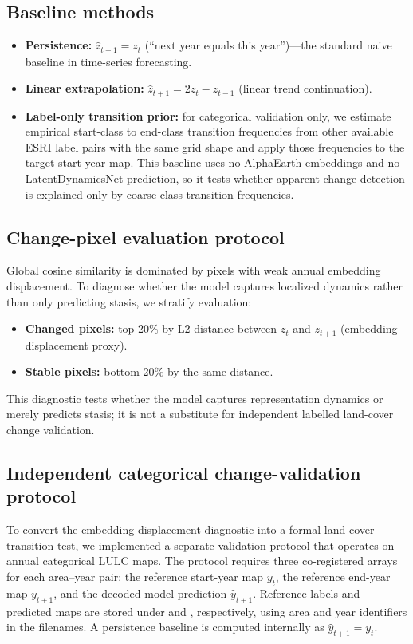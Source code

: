 \documentclass{article}
\begin{document}
\subsection{Baseline methods}

\begin{itemize}
\item \textbf{Persistence:} $\hat{z}_{t+1} = z_t$ (``next year equals this year'')---the standard naive baseline in time-series forecasting.
\item \textbf{Linear extrapolation:} $\hat{z}_{t+1} = 2z_t - z_{t-1}$ (linear trend continuation).
\item \textbf{Label-only transition prior:} for categorical validation only, we estimate empirical start-class to end-class transition frequencies from other available ESRI label pairs with the same grid shape and apply those frequencies to the target start-year map. This baseline uses no AlphaEarth embeddings and no LatentDynamicsNet prediction, so it tests whether apparent change detection is explained only by coarse class-transition frequencies.
\end{itemize}

\subsection{Change-pixel evaluation protocol}

Global cosine similarity is dominated by pixels with weak annual embedding displacement. To diagnose whether the model captures localized dynamics rather than only predicting stasis, we stratify evaluation:
\begin{itemize}
\item \textbf{Changed pixels:} top 20\% by L2 distance between $z_t$ and $z_{t+1}$ (embedding-displacement proxy).
\item \textbf{Stable pixels:} bottom 20\% by the same distance.
\end{itemize}
This diagnostic tests whether the model captures representation dynamics or merely predicts stasis; it is not a substitute for independent labelled land-cover change validation.

\subsection{Independent categorical change-validation protocol}
\label{sec:independent_change_protocol}

To convert the embedding-displacement diagnostic into a formal land-cover transition test, we implemented a separate validation protocol that operates on annual categorical LULC maps. The protocol requires three co-registered arrays for each area--year pair: the reference start-year map $y_t$, the reference end-year map $y_{t+1}$, and the decoded model prediction $\hat{y}_{t+1}$. Reference labels and predicted maps are stored under  and , respectively, using area and year identifiers in the filenames. A persistence baseline is computed internally as $\hat{y}_{t+1}=y_t$.
\end{document}
